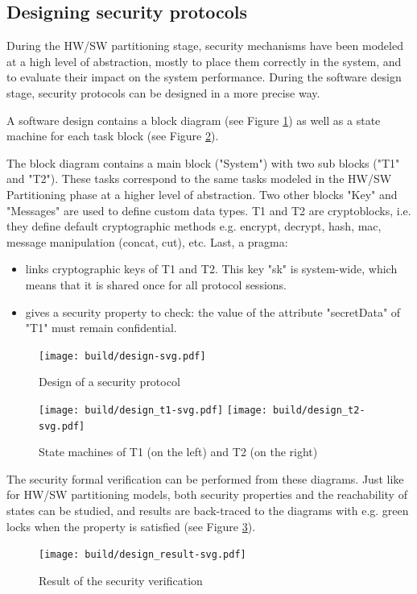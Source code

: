 \documentclass[12pt]{article}
\begin{document}
\subsection{Designing security protocols}
During the HW/SW partitioning stage, security mechanisms have been modeled at a high level of abstraction, mostly to place them correctly in the system, and to evaluate their impact on the system performance. During the software design stage, security protocols can be designed in a more precise way.

A software design contains a block diagram (see Figure \ref{fig:design}) as well as a state machine for each task block (see Figure \ref{fig:design_t}). 

The block diagram contains a main block ("System") with two sub blocks ("T1" and "T2"). These tasks correspond to the same tasks modeled in the HW/SW Partitioning phase at a higher level of abstraction. Two other blocks "Key" and "Messages" are used to define custom data types. T1 and T2 are cryptoblocks, i.e. they define default cryptographic methods e.g. encrypt, decrypt, hash, mac, message manipulation (concat, cut), etc. Last, a pragma:
\begin{itemize}
\item links cryptographic keys of T1 and T2. This key "sk" is system-wide, which means that it is shared once for all protocol sessions.
\item gives a security property to check: the value of the attribute "secretData" of "T1" must remain confidential. 
\end{itemize}


\begin{figure}[htbp]
\centering
\texttt{[image: build/design-svg.pdf]}
\caption{Design of a security protocol} \label{fig:design}
\end{figure}

\begin{figure}[htbp]
\centering
\texttt{[image: build/design\_t1-svg.pdf]}\hspace{3cm}
\texttt{[image: build/design\_t2-svg.pdf]}
\caption{State machines of T1 (on the left) and T2 (on the right)} \label{fig:design_t}
\end{figure}

The security formal verification can be performed from these diagrams. Just like for HW/SW partitioning models, both security properties and the reachability of states can be studied, and results are back-traced to the diagrams with e.g. green locks when the property is satisfied (see Figure \ref{fig:design_result}).

\begin{figure}[htbp]
\centering
\texttt{[image: build/design\_result-svg.pdf]}
\caption{Result of the security verification} \label{fig:design_result}
\end{figure}
\end{document}
